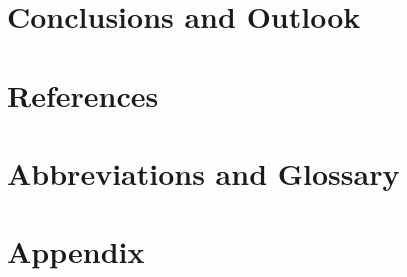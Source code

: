 %

\section{Conclusions and Outlook}


\clearpage
\section{References}
\printbibliography[heading=none]

\clearpage
\section*{Abbreviations and Glossary}
\printglossaries

\clearpage
\section{Appendix}
\label{sec:appendix}



